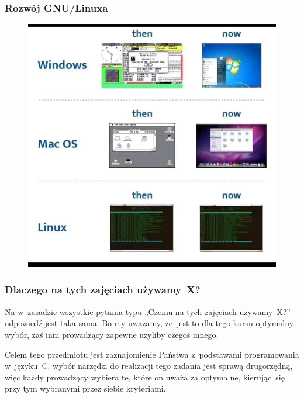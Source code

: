 \documentclass[10pt,t]{beamer}
\begin{document}
\begin{frame}
  \frametitle{Rozwój GNU/Linuxa}

  \vspace{-0.5em}


  \begin{figure}

    \label{fig:Evolution-of-OS}

    \centering


    \includegraphics[scale=0.3]
    {./Presentations-pictures/Evolution-of-operating-systems.jpg}

  \end{figure}

\end{frame}





\begin{frame}
  \frametitle{Dlaczego na tych zajęciach używamy~X?}


  Na w~zasadzie wszystkie pytania typu „Czemu na tych zajęciach
  używamy~X?” odpowiedź jest taka sama. Bo my uważamy, że~jest to dla tego
  kursu optymalny wybór, zaś inni prowadzący zapewne użyliby czegoś innego.

  Celem tego przedmiotu jest zaznajomienie Państwa z~podstawami
  programowania w~języku~C. wybór narzędzi do realizacji tego zadania jest
  sprawą drugorzędną, więc każdy prowadzący wybiera te, które on uważa za
  optymalne, kierując~się przy tym wybranymi przez siebie kryteriami.

\end{frame}
\end{document}
